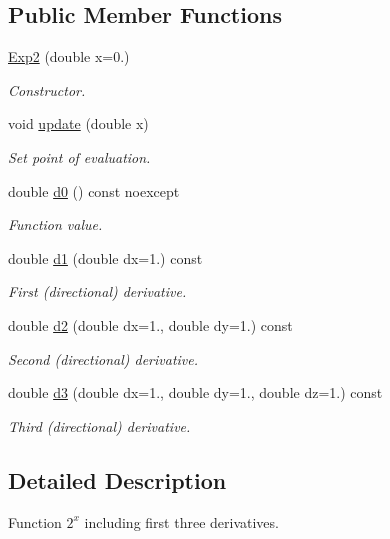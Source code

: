 \subsection*{Public Member Functions}
\begin{DoxyCompactItemize}
\item 
\hyperlink{structfuncy_1_1Exp2_a22b953d77ce574b7da6c681a02bf9811}{Exp2} (double x=0.)
\begin{DoxyCompactList}\small\item\em Constructor. \end{DoxyCompactList}\item 
void \hyperlink{structfuncy_1_1Exp2_a2227a0fddc3cbcaaeea1f94172faaa12}{update} (double x)
\begin{DoxyCompactList}\small\item\em Set point of evaluation. \end{DoxyCompactList}\item 
double \hyperlink{structfuncy_1_1Exp2_ad9dfa1e7ab0b47a9ee9c34501ec2a6ee}{d0} () const noexcept
\begin{DoxyCompactList}\small\item\em Function value. \end{DoxyCompactList}\item 
double \hyperlink{structfuncy_1_1Exp2_a9af7d78ef8f8fee5dfa2e50859a5aa7e}{d1} (double dx=1.) const 
\begin{DoxyCompactList}\small\item\em First (directional) derivative. \end{DoxyCompactList}\item 
double \hyperlink{structfuncy_1_1Exp2_a88c7cb592bd6d6bcd05b8e06ab5eedb1}{d2} (double dx=1., double dy=1.) const 
\begin{DoxyCompactList}\small\item\em Second (directional) derivative. \end{DoxyCompactList}\item 
double \hyperlink{structfuncy_1_1Exp2_a8402ead49e64cc3dced5141e18ec22c5}{d3} (double dx=1., double dy=1., double dz=1.) const 
\begin{DoxyCompactList}\small\item\em Third (directional) derivative. \end{DoxyCompactList}\end{DoxyCompactItemize}


\subsection{Detailed Description}
Function $2^x$ including first three derivatives. 

